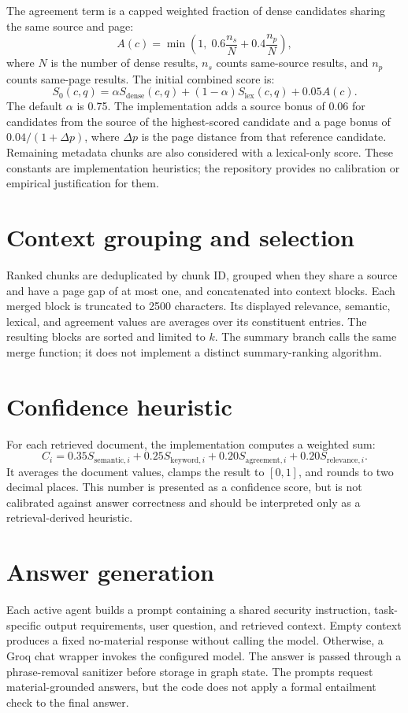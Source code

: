 The agreement term is a capped weighted fraction of dense candidates sharing the same source and page:
\begin{equation}
A(c)=\min\left(1,\;0.6\frac{n_s}{N}+0.4\frac{n_p}{N}\right),
\label{eq:agreement}
\end{equation}
where \(N\) is the number of dense results, \(n_s\) counts same-source results, and \(n_p\) counts same-page results. The initial combined score is:
\begin{equation}
S_0(c,q)=\alpha S_{\mathrm{dense}}(c,q)
+(1-\alpha)S_{\mathrm{lex}}(c,q)+0.05A(c).
\label{eq:hybrid-score}
\end{equation}
The default \(\alpha\) is 0.75. The implementation adds a source bonus of 0.06 for candidates from the source of the highest-scored candidate and a page bonus of \(0.04/(1+\Delta p)\), where \(\Delta p\) is the page distance from that reference candidate. Remaining metadata chunks are also considered with a lexical-only score. These constants are implementation heuristics; the repository provides no calibration or empirical justification for them.

\section{Context grouping and selection}
Ranked chunks are deduplicated by chunk ID, grouped when they share a source and have a page gap of at most one, and concatenated into context blocks. Each merged block is truncated to 2500 characters. Its displayed relevance, semantic, lexical, and agreement values are averages over its constituent entries. The resulting blocks are sorted and limited to \(k\). The summary branch calls the same merge function; it does not implement a distinct summary-ranking algorithm.

\section{Confidence heuristic}
For each retrieved document, the implementation computes a weighted sum:
\begin{equation}
C_i=0.35S_{\mathrm{semantic},i}
+0.25S_{\mathrm{keyword},i}
+0.20S_{\mathrm{agreement},i}
+0.20S_{\mathrm{relevance},i}.
\label{eq:confidence-item}
\end{equation}
It averages the document values, clamps the result to \([0,1]\), and rounds to two decimal places. This number is presented as a confidence score, but is not calibrated against answer correctness and should be interpreted only as a retrieval-derived heuristic.

\section{Answer generation}
Each active agent builds a prompt containing a shared security instruction, task-specific output requirements, user question, and retrieved context. Empty context produces a fixed no-material response without calling the model. Otherwise, a Groq chat wrapper invokes the configured model. The answer is passed through a phrase-removal sanitizer before storage in graph state. The prompts request material-grounded answers, but the code does not apply a formal entailment check to the final answer.
